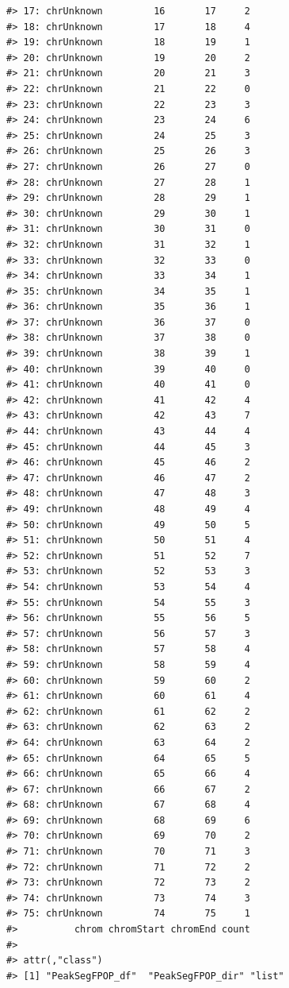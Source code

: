 \documentclass[12pt]{article}\usepackage[]{graphicx}\usepackage[]{color}
\makeatletter
\newenvironment{kframe}{%
 \def\at@end@of@kframe{}%
 \ifinner\ifhmode%
  \def\at@end@of@kframe{\end{minipage}}%
  \begin{minipage}{\columnwidth}%
 \fi\fi%
 \def\FrameCommand##1{\hskip\@totalleftmargin \hskip-\fboxsep
 \colorbox{shadecolor}{##1}\hskip-\fboxsep
     \hskip-\linewidth \hskip-\@totalleftmargin \hskip\columnwidth}%
 \MakeFramed {\advance\hsize-\width
   \@totalleftmargin\z@ \linewidth\hsize
   \@setminipage}}%
 {\par\unskip\endMakeFramed%
 \at@end@of@kframe}
\newenvironment{knitrout}{}{} %
\makeatother
\begin{document}
\begin{knitrout}
\begin{kframe}
\begin{verbatim}
#> 17: chrUnknown         16       17     2
#> 18: chrUnknown         17       18     4
#> 19: chrUnknown         18       19     1
#> 20: chrUnknown         19       20     2
#> 21: chrUnknown         20       21     3
#> 22: chrUnknown         21       22     0
#> 23: chrUnknown         22       23     3
#> 24: chrUnknown         23       24     6
#> 25: chrUnknown         24       25     3
#> 26: chrUnknown         25       26     3
#> 27: chrUnknown         26       27     0
#> 28: chrUnknown         27       28     1
#> 29: chrUnknown         28       29     1
#> 30: chrUnknown         29       30     1
#> 31: chrUnknown         30       31     0
#> 32: chrUnknown         31       32     1
#> 33: chrUnknown         32       33     0
#> 34: chrUnknown         33       34     1
#> 35: chrUnknown         34       35     1
#> 36: chrUnknown         35       36     1
#> 37: chrUnknown         36       37     0
#> 38: chrUnknown         37       38     0
#> 39: chrUnknown         38       39     1
#> 40: chrUnknown         39       40     0
#> 41: chrUnknown         40       41     0
#> 42: chrUnknown         41       42     4
#> 43: chrUnknown         42       43     7
#> 44: chrUnknown         43       44     4
#> 45: chrUnknown         44       45     3
#> 46: chrUnknown         45       46     2
#> 47: chrUnknown         46       47     2
#> 48: chrUnknown         47       48     3
#> 49: chrUnknown         48       49     4
#> 50: chrUnknown         49       50     5
#> 51: chrUnknown         50       51     4
#> 52: chrUnknown         51       52     7
#> 53: chrUnknown         52       53     3
#> 54: chrUnknown         53       54     4
#> 55: chrUnknown         54       55     3
#> 56: chrUnknown         55       56     5
#> 57: chrUnknown         56       57     3
#> 58: chrUnknown         57       58     4
#> 59: chrUnknown         58       59     4
#> 60: chrUnknown         59       60     2
#> 61: chrUnknown         60       61     4
#> 62: chrUnknown         61       62     2
#> 63: chrUnknown         62       63     2
#> 64: chrUnknown         63       64     2
#> 65: chrUnknown         64       65     5
#> 66: chrUnknown         65       66     4
#> 67: chrUnknown         66       67     2
#> 68: chrUnknown         67       68     4
#> 69: chrUnknown         68       69     6
#> 70: chrUnknown         69       70     2
#> 71: chrUnknown         70       71     3
#> 72: chrUnknown         71       72     2
#> 73: chrUnknown         72       73     2
#> 74: chrUnknown         73       74     3
#> 75: chrUnknown         74       75     1
#>          chrom chromStart chromEnd count
#> 
#> attr(,"class")
#> [1] "PeakSegFPOP_df"  "PeakSegFPOP_dir" "list"
\end{verbatim}
\end{kframe}
\end{knitrout}
\end{document}
